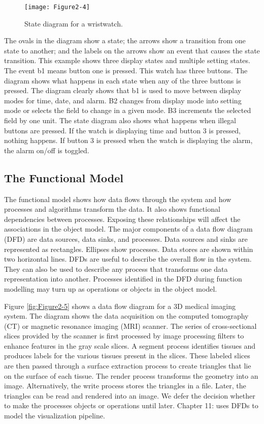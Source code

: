 \begin{figure}[!htb]
	\centering
	\texttt{[image: Figure2-4]}
	\caption{State diagram for a wristwatch.}
	\label{fig:Figure2-4}
\end{figure}

The ovals in the diagram show a state; the arrows show a transition from one state to another; and the labels on the arrows show an event that causes the state transition. This example shows three display states and multiple setting states. The event b1 means button one is pressed. This watch has three buttons. The diagram shows what happens in each state when any of the three buttons is pressed. The diagram clearly shows that b1 is used to move between display modes for time, date, and alarm. B2 changes from display mode into setting mode or selects the field to change in a given mode. B3 increments the selected field by one unit. The state diagram also shows what happens when illegal buttons are pressed. If the watch is displaying time and button 3 is pressed, nothing happens. If button 3 is pressed when the watch is displaying the alarm, the alarm on/off is toggled.

\subsection{The Functional Model}

The functional model shows how data flows through the system and how processes and algorithms transform the data. It also shows functional dependencies between processes. Exposing these relationships will affect the associations in the object model. The major components of a data flow diagram (DFD) are data sources, data sinks, and processes. Data sources and sinks are represented as rectangles. Ellipses show processes. Data stores are shown within two horizontal lines. DFDs are useful to describe the overall flow in the system. They can also be used to describe any process that transforms one data representation into another. Processes identified in the DFD during function modelling may turn up as operations or objects in the object model.

Figure \ref{fig:Figure2-5} shows a data flow diagram for a 3D medical imaging system. The diagram shows the data acquisition on the computed tomography (CT) or magnetic resonance imaging (MRI) scanner. The series of cross-sectional slices provided by the scanner is first processed by image processing filters to enhance features in the gray scale slices. A segment process identifies tissues and produces labels for the various tissues present in the slices. These labeled slices are then passed through a surface extraction process to create triangles that lie on the surface of each tissue. The render process transforms the geometry into an image. Alternatively, the write process stores the triangles in a file. Later, the triangles can be read and rendered into an image. We defer the decision whether to make the processes objects or operations until later. Chapter 11:  uses DFDs to model the visualization pipeline.

